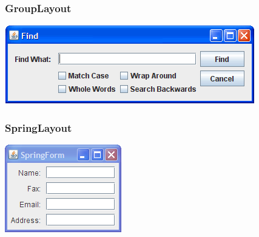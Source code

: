 \begin{frame}[fragile]
	\frametitle{GroupLayout}
	\includegraphics[scale=1]{find.png}
\end{frame}

\begin{frame}[fragile]
	\frametitle{SpringLayout}
	\includegraphics[scale=1]{SpringForm.png}
\end{frame}


